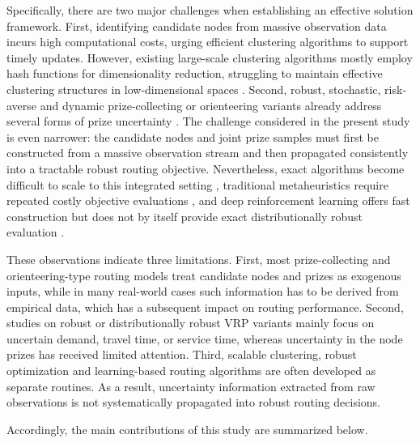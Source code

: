 \documentclass[preprint,12pt,authoryear]{elsarticle}
\theoremstyle{definition}
\begin{document}
Specifically, there are two major challenges when establishing an effective solution framework. 
First, identifying candidate nodes from massive observation data incurs high computational costs, urging efficient clustering algorithms to support timely updates. 
However, existing large-scale clustering algorithms mostly employ hash functions for dimensionality reduction, struggling to maintain effective clustering structures in low-dimensional spaces \citep{shin2025dynamic}. 
Second, robust, stochastic, risk-averse and dynamic prize-collecting or orienteering variants already address several forms of prize uncertainty \citep{marinakis2013particle,secomandi2009reoptimization,zhang2012scatter,wang2025sinkhorn}. 
The challenge considered in the present study is even narrower: the candidate nodes and joint prize samples must first be constructed from a massive observation stream and then propagated consistently into a tractable robust routing objective. 
Nevertheless, exact algorithms become difficult to scale to this integrated setting \citep{costa2019exact}, traditional metaheuristics require repeated costly objective evaluations \citep{liu2025conditional}, and deep reinforcement learning offers fast construction but does not by itself provide exact distributionally robust evaluation \citep{bai2023analytics,pan2023deep,mesa2025machine}.



These observations indicate three limitations. 
First, most prize-collecting and orienteering-type routing models treat candidate nodes and prizes as exogenous inputs, while in many real-world cases such information has to be derived from empirical data, which has a subsequent impact on routing performance. 
Second, studies on robust or distributionally robust VRP variants mainly focus on uncertain demand, travel time, or service time, whereas uncertainty in the node prizes has received limited attention. 
Third, scalable clustering, robust optimization and learning-based routing algorithms are often developed as separate routines. 
As a result, uncertainty information extracted from raw observations is not systematically propagated into robust routing decisions.


Accordingly, the main contributions of this study are summarized below.
\end{document}
